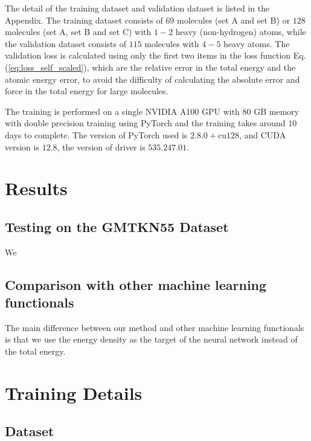 \documentclass[%
twocolumn,
amsmath,
amssymb,
groupedaddress,
reprint,%
]{revtex4-2}
\newcommand{\eq}[1]{Eq.\,(\ref{#1})}
\begin{document}
The detail of the training dataset and validation dataset is listed in the Appendix.
% 
The training dataset consists of $69$ molecules (set A and set B) or $128$ molecules  (set A, set B and set C) with $1-2$ heavy (non-hydrogen) atoms, while the validation dataset consists of $115$ molecules with $4-5$ heavy atoms.
% 
The validation loss is calculated using only the first two items in the loss function \eq{eq:loss_self_scaled}, which are the relative error in the total energy and the atomic energy error, to avoid the difficulty of calculating the absolute error and force in the total energy for large molecules.

The training is performed on a single NVIDIA A100 GPU with 80 GB memory with double precision training using PyTorch \cite{paszkePyTorchImperativeStyle2019-12-03} and the training takes around $10$ days to complete. The version of PyTorch used is $2.8.0+$cu$128$, and CUDA version is $12.8$, the version of driver is $535.247.01$.

\section{Results}
\subsection{Testing on the GMTKN55 Dataset}
We

\subsection{Comparison with other machine learning functionals}
The main difference between our method and other machine learning functionals \cite{nagaiCompletingDensityFunctional2020-05-05,chenDeePKSComprehensiveDataDriven2021-01-12,kirkpatrickPushingFrontiersDensity2021-12-10,luiseAccurateScalableExchangecorrelation2025-06-23,anMitigatingErrorCancellation2025-08-07} is that we use the energy density as the target of the neural network instead of the total energy.



\clearpage
\newpage

\appendix

\section{Training Details}

\subsection{Dataset}
\end{document}
